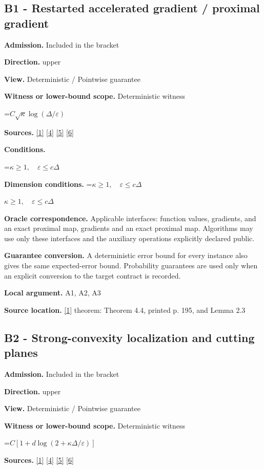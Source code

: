 \documentclass[10pt,a4paper]{article}
\newcommand{\AtlasMath}[1]{\par\begingroup\centering\setbox0=\hbox{$\displaystyle #1$}\ifdim\wd0>1.4\linewidth\typeout{ATLAS WIDE FORMULA: \the\wd0}\fi\ifdim\wd0>\linewidth\resizebox{\linewidth}{!}{\box0}\else\box0\fi\par\endgroup}
\newcommand{\AtlasInlineMath}[1]{\begingroup\setbox0=\hbox{$#1$}\ifdim\wd0>.4\linewidth\endgroup\AtlasMath{#1}\else\endgroup$#1$\fi}
\begin{document}
\subsection{B1 - Restarted accelerated gradient / proximal gradient}
\textbf{Admission.} Included in the bracket

\textbf{Direction.} upper

\textbf{View.} Deterministic / Pointwise guarantee

\textbf{Witness or lower-bound scope.} Deterministic witness

\AtlasMath{C\sqrt\kappa\log(\Delta/\varepsilon)}
\textbf{Sources.} \href{https://www.tau.ac.il/~becka/FISTA.pdf}{[1]} \href{https://arxiv.org/pdf/1405.4980}{[4]} \href{https://www2.isye.gatech.edu/~nemirovs/MOR_AccuracyCertificates.pdf}{[5]} \href{https://arxiv.org/pdf/2609.20701}{[6]}

\textbf{Conditions.} 
\AtlasMath{\kappa\ge1,\quad\varepsilon\le c\Delta}


\textbf{Dimension conditions.} \AtlasInlineMath{\kappa\ge1,\quad\varepsilon\le c\Delta}

\textbf{Oracle correspondence.} Applicable interfaces: function values, gradients, and an exact proximal map, gradients and an exact proximal map. Algorithms may use only these interfaces and the auxiliary operations explicitly declared public.

\textbf{Guarantee conversion.} A deterministic error bound for every instance also gives the same expected-error bound. Probability guarantees are used only when an explicit conversion to the target contract is recorded.

\textbf{Local argument.} A1, A2, A3

\textbf{Source location.} \href{https://www.tau.ac.il/~becka/FISTA.pdf}{[1]} theorem: Theorem 4.4, printed p. 195, and Lemma 2.3

\subsection{B2 - Strong-convexity localization and cutting planes}
\textbf{Admission.} Included in the bracket

\textbf{Direction.} upper

\textbf{View.} Deterministic / Pointwise guarantee

\textbf{Witness or lower-bound scope.} Deterministic witness

\AtlasMath{C[1+d\log(2+\kappa\Delta/\varepsilon)]}
\textbf{Sources.} \href{https://www.tau.ac.il/~becka/FISTA.pdf}{[1]} \href{https://arxiv.org/pdf/1405.4980}{[4]} \href{https://www2.isye.gatech.edu/~nemirovs/MOR_AccuracyCertificates.pdf}{[5]} \href{https://arxiv.org/pdf/2609.20701}{[6]}
\end{document}
